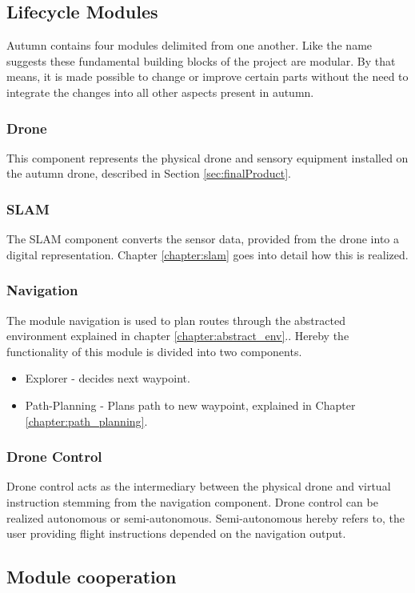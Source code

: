\subsection{Lifecycle Modules}

Autumn contains four modules delimited from one another. Like the name suggests these fundamental building blocks of the project are modular. By that means, it is made possible to change or improve certain parts without the need to integrate the changes into all other aspects present in autumn.

\subsubsection{Drone} This component represents the physical drone and sensory equipment installed on the autumn drone, described in Section \ref{sec:finalProduct}.  
\subsubsection{SLAM} The SLAM component converts the sensor data, provided from the drone into a digital representation. Chapter \ref{chapter:slam} goes into detail how this is realized.
\subsubsection{Navigation} The module navigation is used to plan routes through the abstracted environment explained in chapter \ref{chapter:abstract_env}.. Hereby the functionality of this module is divided into two components.
	\begin{itemize}
		\item Explorer - decides next waypoint.
		\item Path-Planning - Plans path to new waypoint, explained in Chapter \ref{chapter:path_planning}.
	\end{itemize}
\subsubsection{Drone Control}
Drone control acts as the intermediary between the physical drone and virtual instruction stemming from the navigation component. Drone control can be realized autonomous or semi-autonomous. Semi-autonomous hereby refers to, the user providing flight instructions depended on the navigation output.

\subsection{Module cooperation}

